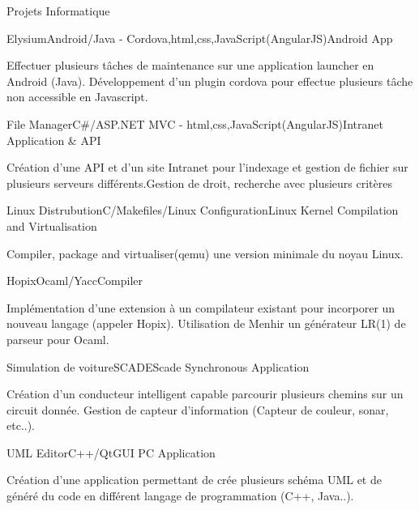 \documentclass{resume} %
\begin{document}
\begin{rSection}{Projets Informatique}
	
	\begin{rSubsection}{Elysium}{Android/Java - Cordova,html,css,JavaScript(AngularJS)}{Android App }{}
		\item Effectuer plusieurs tâches de maintenance sur une application launcher en Android (Java). Développement d'un plugin cordova pour effectue plusieurs tâche non accessible en Javascript.
	\end{rSubsection}
	
	
	\begin{rSubsection}{File Manager}{C\#/ASP.NET MVC - html,css,JavaScript(AngularJS)}{Intranet Application \& API}{}
		\item Création d'une API et d'un site Intranet pour l'indexage et gestion de fichier sur plusieurs serveurs différents.Gestion de droit, recherche avec plusieurs critères
	\end{rSubsection}
	
	\begin{rSubsection}{Linux Distrubution}{C/Makefiles/Linux Configuration}{Linux Kernel Compilation and Virtualisation}{}
		\item Compiler, package and virtualiser(qemu) une version minimale du noyau Linux. 
	\end{rSubsection}
	
	\begin{rSubsection}{Hopix}{Ocaml/Yacc}{Compiler}{}
		\item Implémentation d'une extension à un compilateur existant pour incorporer un nouveau langage (appeler Hopix). Utilisation de Menhir un générateur LR(1) de parseur pour Ocaml.
	\end{rSubsection}
	
	\begin{rSubsection}{Simulation de voiture}{SCADE}{Scade Synchronous Application}{}
		\item Création d'un conducteur intelligent capable parcourir plusieurs chemins sur un circuit donnée. Gestion de capteur d'information (Capteur de couleur, sonar, etc..).
	\end{rSubsection}
	
	\begin{rSubsection}{UML Editor}{C++/Qt}{GUI PC Application}{}
		\item Création d'une application permettant de crée plusieurs schéma UML et de généré du code en différent langage de programmation (C++, Java..).
	\end{rSubsection}
	

\end{rSection}
\end{document}
